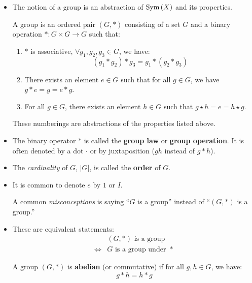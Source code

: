\begin{itemize}
\begin{enumerate}
    \end{enumerate}
    \item The notion of a group is an abstraction of $\mathrm{Sym}\,(X)$ and its properties.
    \begin{definition}
        A group is an ordered pair $(G,*)$ consisting of a set $G$ and a binary operation $*:G\times G \rightarrow G$ such that:
        \begin{enumerate}
            \setcounter{enumi}{0}
            \item $*$ is associative, $\forall g_1,g_2,g_3 \in G$, we have:
            \begin{equation}
                (g_1 * g_2)*g_3 = g_1*(g_2*g_3)
            \end{equation}
            \item There exists an element $e \in G$ such that for all $g\in G$, we have $g*e=g=e*g$.
            \item For all $g\in G$, there exists an element $h\in G$ such that $g\star h = e = h\star g$.
        \end{enumerate}
        These numberings are abstractions of the properties listed above.
    \end{definition}
    \item The binary operator $*$ is called the \textbf{group law} or \textbf{group operation}. It is often denoted by a dot $\cdot$ or by juxtaposition ($gh$ instead of $g*h$).
    \item The \textit{cardinality} of $G$, $|G|$, is called the \textbf{order} of $G$.
    \item It is common to denote $e$ by $1$ or $I$.
    \begin{warning}
        A common \textit{misconceptions} is saying ``$G$ is a group'' instead of ``$(G,*)$ is a group.'' 
    \end{warning}
    \item These are equivalent statements:
    \begin{align}
        & (G,*) \text{ is a group} \\ 
        \iff & G \text{ is a group under }*
    \end{align}
    \begin{definition}
        A group $(G,*)$ is \textbf{abelian} (or commutative) if for all $g,h \in G$, we have:
        \begin{equation}
            g*h = h*g
        \end{equation}
    \end{definition}

\end{itemize}
